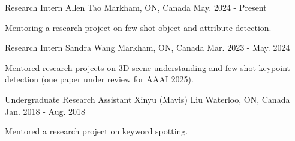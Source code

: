 \begin{cventries}
\cventry
{Research Intern} %
{Allen Tao} %
{Markham, ON, Canada} %
{May. 2024 - Present} %
{ %
\begin{cvitems}
\item {Mentoring a research project on few-shot object and attribute detection.}
\end{cvitems}
}
\cventry
{Research Intern} %
{Sandra Wang} %
{Markham, ON, Canada} %
{Mar. 2023 - May. 2024} %
{ %
\begin{cvitems}
\item {Mentored research projects on 3D scene understanding and few-shot keypoint detection (one paper under review for AAAI 2025).}
\end{cvitems}
}
\cventry
{Undergraduate Research Assistant} %
{Xinyu (Mavis) Liu} %
{Waterloo, ON, Canada} %
{Jan. 2018 - Aug. 2018} %
{ %
\begin{cvitems}
\item {Mentored a research project on keyword spotting.}
\end{cvitems}
}
\end{cventries}
